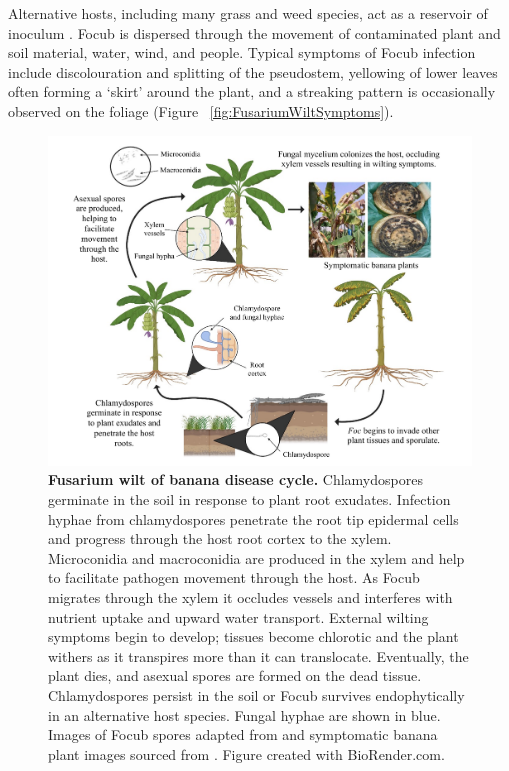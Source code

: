 Alternative hosts, including many grass and weed species, act as a reservoir of inoculum \parencite{Hennessy2005}.  \ac{Focub} is dispersed through the movement of contaminated plant and soil material, water, wind, and people. Typical symptoms of \ac{Focub} infection include discolouration and splitting of the pseudostem, yellowing of lower leaves often forming a ‘skirt’ around the plant, and a streaking pattern is occasionally observed on the foliage (Figure ~\ref{fig:FusariumWiltSymptoms}). 

\begin{figure}[p!]
    \includegraphics[width=16cm]{Figures/MyLifeCylceNarrow.pdf}
    \caption[Fusarium wilt of banana disease cycle.]{\textbf{Fusarium wilt of banana disease cycle.} Chlamydospores germinate in the soil in response to plant root exudates. Infection hyphae from chlamydospores penetrate the root tip epidermal cells and progress through the host root cortex to the xylem. Microconidia and macroconidia are produced in the xylem and help to facilitate pathogen movement through the host. As \acl{Focub} migrates through the xylem it occludes vessels and interferes with nutrient uptake and upward water transport. External wilting symptoms begin to develop; tissues become chlorotic and the plant withers as it transpires more than it can translocate. Eventually, the plant dies, and asexual spores are formed on the dead tissue. Chlamydospores persist in the soil or \acl{Focub}  survives endophytically in an alternative host species. Fungal hyphae are shown in blue. Images of \acl{Focub}  spores adapted from \textcite{Fourie2011} and symptomatic banana plant images sourced from \textcite{Maymon2020}. Figure created with BioRender.com.}
    \label{fig:MyLifeCycle}
\end{figure}

